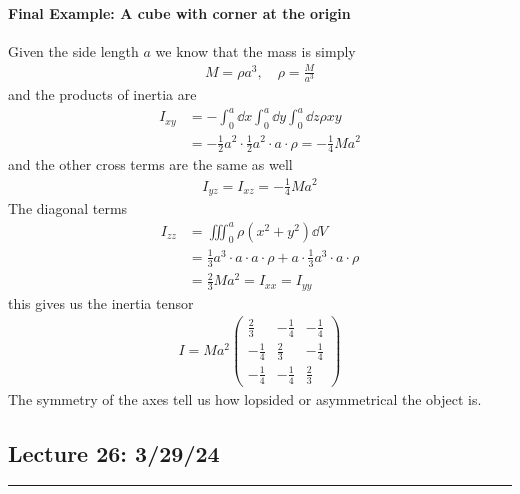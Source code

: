\documentclass[../main.tex]{subfiles}
\begin{document}
\paragraph*{Final Example: A cube with corner at the origin} Given the side length $a$ we know that
the mass is simply
\begin{align*}
    M = \rho a^3,\quad \rho = \frac{M}{a^3}
\end{align*} 
and the products of inertia are
\begin{align*}
    I_{xy} &= -\int_0^a \dd{x} \int_0^a \dd{y} \int_0^a \dd{z} \rho x y \\
    &= -\frac{1}{2} a^2 \cdot \frac{1}{2}a^2 \cdot a \cdot \rho = -\frac{1}{4}Ma^2
\end{align*}
and the other cross terms are the same as well
\begin{align*}
    I_{yz} = I_{xz} = -\frac{1}{4}Ma^2
\end{align*}
The diagonal terms
\begin{align*}
    I_{zz} &= \iiint_0^a \rho (x^2 + y^2) \dd{V} \\
    &= \frac{1}{3} a^3 \cdot a \cdot a \cdot \rho + a \cdot \frac{1}{3} a^3 \cdot a \cdot \rho \\
    &= \frac{2}{3} Ma^2 = I_{xx} = I_{yy} 
\end{align*}
this gives us the inertia tensor
\begin{align*}
    I = Ma^2 \begin{pmatrix}
        \frac{2}{3} & -\frac{1}{4} & -\frac{1}{4} \\[6pt]
        -\frac{1}{4} & \frac{2}{3} & -\frac{1}{4} \\[6pt]
        -\frac{1}{4} & -\frac{1}{4} & \frac{2}{3}
    \end{pmatrix}
\end{align*}
The symmetry of the axes tell us how lopsided or asymmetrical the object is.

\newpage
\subsection*{Lecture 26: \hfill 3/29/24}
\hrule \vspace{10px}
\end{document}
